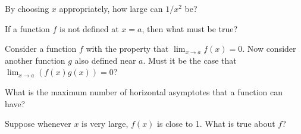 \documentclass{ximera}
\newcommand{\recommendation}[1]{}
\newcommand{\GoodQuestions}[1]{}
\begin{document}
\begin{shuffle}
\begin{problem}
  By choosing $x$ appropriately, how large can $1/x^2$ be?
  \begin{multipleChoice}
  \end{multipleChoice}
\end{problem}

\begin{problem}
  If a function $f$ is not defined at $x=a$, then what must be true?
  \begin{multipleChoice}
  \end{multipleChoice} 
\end{problem}

\begin{problem}
  Consider a function $f$ with the property that
  $\lim_{x\to a} f(x) =0$.  Now consider another function $g$ also
  defined near $a$.  Must it be the case that
  $\lim_{x\to a} \left(f(x)g(x)\right) = 0$?
  \begin{multipleChoice}
  \end{multipleChoice}
\end{problem}





\begin{problem}
  What is the maximum number of horizontal asymptotes that a function can have?
  \begin{multipleChoice}
  \end{multipleChoice}
\end{problem}

\begin{problem}
  Suppose whenever $x$ is very large, $f(x)$ is close to 1.  What is true about $f$?
  \begin{multipleChoice}
  \end{multipleChoice}
\end{problem}



\end{shuffle}
\end{document}
